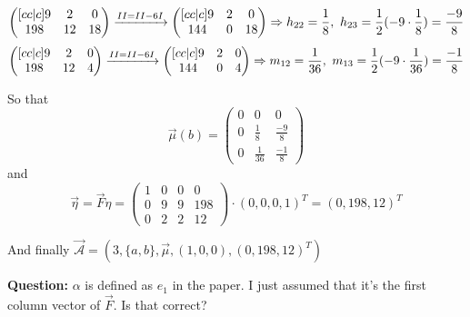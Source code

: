         \[   \begin{pmatrix}[c c | c]
                9 & 2 & 0 \\
                198 & 12 & 18 \\
            \end{pmatrix} 
            \xrightarrow{\rom{2} = \rom{2} - 6\rom{1}} 
            \begin{pmatrix}[c c | c]
                9 & 2 & 0 \\
                144 & 0 & 18 \\
            \end{pmatrix} 
            \Rightarrow h_{22} = \frac{1}{8}, \ h_{23} = \frac{1}{2}(- 9 \cdot \frac{1}{8}) = \frac{-9}{8}
        \]
        \[   \begin{pmatrix}[c c | c]
                9 & 2 & 0 \\
                198 & 12 & 4 \\
            \end{pmatrix} 
            \xrightarrow{\rom{2} = \rom{2} - 6\rom{1}} 
            \begin{pmatrix}[c c | c]
                9 & 2 & 0 \\
                144 & 0 & 4 \\
            \end{pmatrix} 
            \Rightarrow m_{12} = \frac{1}{36}, \ m_{13} = \frac{1}{2}(- 9 \cdot \frac{1}{36}) = \frac{-1}{8}
        \]
        
        So that \[ \overrightarrow{\mu}(b) = 
            \begin{pmatrix}
                0 & 0 & 0 \\
                0 & \frac{1}{8} & \frac{-9}{8} \\
                0 & \frac{1}{36} & \frac{-1}{8} 
            \end{pmatrix} \]
        and 
        \[ \overrightarrow{\eta} = \overrightarrow{F} \eta =  \begin{pmatrix}
                1 & 0 & 0 & 0 \\
                0 & 9 & 9 & 198 \\
                0 & 2 & 2 & 12 
            \end{pmatrix} \cdot (0,0,0,1)^T = (0, 198, 12)^T \]
            
            
        And finally $\overrightarrow{\mathcal{A}} = (3, \{a, b\}, \overrightarrow{\mu}, (1,0,0), (0, 198, 12)^T)$
        
        \textbf{Question:} $\alpha$ is defined as $e_1$ in the paper. I just assumed that it's the first column vector of $\overrightarrow{F}$. Is that correct? \\
        
